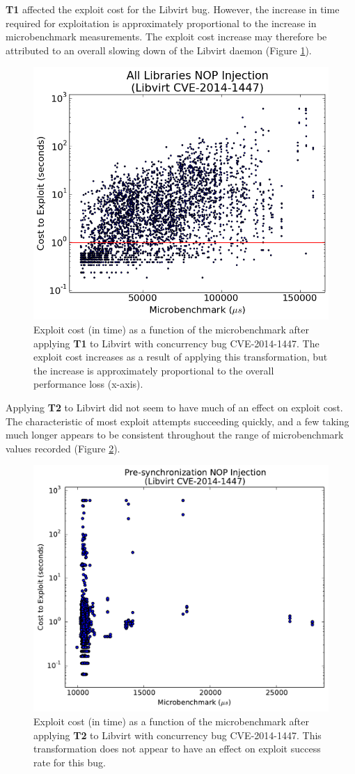 \textbf{T1} affected the exploit cost for the Libvirt bug.
However, the increase in time required for exploitation is approximately proportional to the increase in microbenchmark measurements.
The exploit cost increase may therefore be attributed to an overall slowing down of the Libvirt daemon (Figure \ref{fig_libvirt-all}).
\begin{figure}
	\centering
	\includegraphics[width=.75\columnwidth]{figures/libvirt-all}
	\caption{
		Exploit cost (in time) as a function of the microbenchmark after applying \textbf{T1} to Libvirt with concurrency bug CVE-2014-1447.
		The exploit cost increases as a result of applying this transformation, but the increase is approximately proportional to the overall performance loss (x-axis).
	}
	\label{fig_libvirt-all}
\end{figure}

Applying \textbf{T2} to Libvirt did not seem to have much of an effect on exploit cost.
The characteristic of most exploit attempts succeeding quickly, and a few taking much longer appears to be consistent throughout the range of microbenchmark values recorded (Figure \ref{fig_libvirt-pre}).
\begin{figure}
	\centering
	\includegraphics[width=.75\columnwidth]{figures/libvirt-pre}
	\caption{
		Exploit cost (in time) as a function of the microbenchmark after applying \textbf{T2} to Libvirt with concurrency bug CVE-2014-1447.
		This transformation does not appear to have an effect on exploit success rate for this bug.
	}
	\label{fig_libvirt-pre}
\end{figure}

